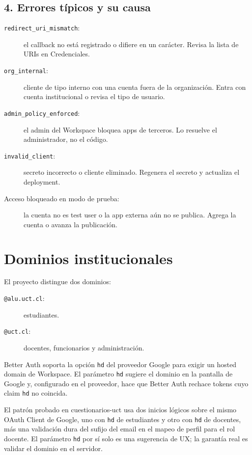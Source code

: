 \documentclass[11pt,a4paper]{article}
\begin{document}
\subsection{4. Errores típicos y su causa}

\begin{description}
  \item[\texttt{redirect\_uri\_mismatch}:] el callback no está registrado o
    difiere en un carácter. Revisa la lista de URIs en Credenciales.
  \item[\texttt{org\_internal}:] cliente de tipo interno con una cuenta fuera
    de la organización. Entra con cuenta institucional o revisa el tipo de
    usuario.
  \item[\texttt{admin\_policy\_enforced}:] el admin del Workspace bloquea apps
    de terceros. Lo resuelve el administrador, no el código.
  \item[\texttt{invalid\_client}:] secreto incorrecto o cliente eliminado.
    Regenera el secreto y actualiza el deployment.
  \item[Acceso bloqueado en modo de prueba:] la cuenta no es test user o la
    app externa aún no se publica. Agrega la cuenta o avanza la publicación.
\end{description}

\section{Dominios institucionales}

El proyecto distingue dos dominios:

\begin{description}
  \item[\texttt{@alu.uct.cl}:] estudiantes.
  \item[\texttt{@uct.cl}:] docentes, funcionarios y administración.
\end{description}

Better Auth soporta la opción \texttt{hd} del proveedor Google para exigir un
hosted domain de Workspace. El parámetro \texttt{hd} sugiere el dominio en la
pantalla de Google y, configurado en el proveedor, hace que Better Auth
rechace tokens cuyo claim \texttt{hd} no coincida.

El patrón probado en cuestionarios-uct usa dos inicios lógicos sobre el mismo
OAuth Client de Google, uno con \texttt{hd} de estudiantes y otro con
\texttt{hd} de docentes, más una validación dura del sufijo del email en el
mapeo de perfil para el rol docente. El parámetro \texttt{hd} por sí solo es
una sugerencia de UX; la garantía real es validar el dominio en el servidor.
\end{document}
